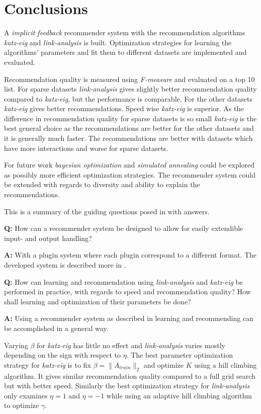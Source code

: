 \chapter{Conclusions}\label{cha:conclusions}

A \textit{implicit feedback} recommender system with the recommendation algorithms \textit{katz-eig} and \textit{link-analysis} is built. Optimization strategies for learning the algorithms' parameters and fit them to different datasets are implemented and evaluated.

Recommendation quality is measured using \textit{F-measure} and evaluated on a top 10 list.  For sparse datasets \textit{link-analysis} gives slightly better recommendation quality compared to \textit{katz-eig}, but the performance is comparable. For the other datasets \textit{katz-eig} gives better recommendations. Speed wise \textit{katz-eig} is superior.  As the difference in recommendation quality for sparse datasets is so small \textit{katz-eig} is the best general choice as the recommendations are better for the other datasets and it is generally much faster.  The recommendations are better with datasets which have more interactions and worse for sparse datasets.

For future work \textit{bayesian optimization} and \textit{simulated annealing} could be explored as possibly more efficient optimization strategies.  The recommender system could be extended with regards to diversity and ability to explain the recommendations.

\newpage

This is a summary of the guiding questions posed in  with answers.

\textbf{Q:} How can a recommender system be designed to allow for easily extendible input- and output handling?

\textbf{A:} With a plugin system where each plugin correspond to a different format. The developed system is described more in .


\textbf{Q:} How can learning and recommendation using \textit{link-analysis} and \textit{katz-eig} be performed in practice, with regards to speed and recommendation quality?
How shall learning and optimization of their parameters be done?

\textbf{A:} Using a recommender system as described in  learning and recommending can be accomplished in a general way.

Varying $\beta$ for \textit{katz-eig} has little no effect and \textit{link-analysis} varies mostly depending on the sign with respect to $\eta$. The best parameter optimization strategy for \textit{katz-eig} is to fix $\beta = \| A_{train}\|_2$ and optimize $K$ using a hill climbing algorithm. It gives similar recommendation quality compared to a full grid search but with better speed. Similarly the best optimization strategy for \textit{link-analysis} only examines $\eta = 1$ and $\eta = -1$ while using an adaptive hill climbing algorithm to optimize $\gamma$.

